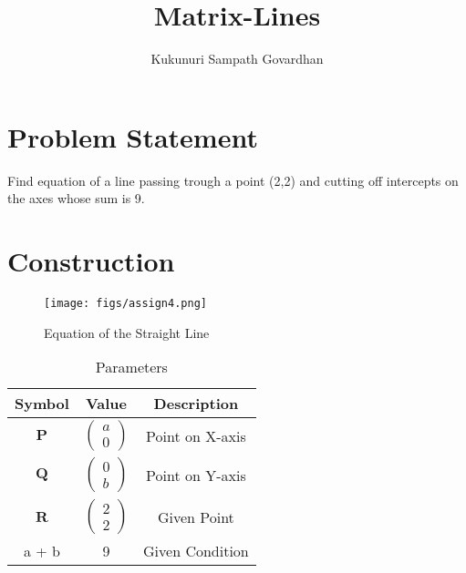 \documentclass[journal,12pt,twocolumn]{IEEEtran}
\title{
Matrix-Lines
}
\author{Kukunuri Sampath Govardhan}
\newcommand{\myvec}[1]{\ensuremath{\begin{pmatrix}#1\end{pmatrix}}}
\let\vec\mathbf
\begin{document}
\maketitle
\tableofcontents
\bigskip
\section{Problem Statement}
Find equation of a line passing trough a point (2,2) and cutting off intercepts on the axes whose sum is 9.\\
\section{Construction}
\begin{figure}[h]
    \centering
\texttt{[image: figs/assign4.png]}
    \caption{Equation of the Straight Line}
    \label{fig:my_label}
\end{figure}
\vspace{2cm}
\begin{table}[h]
    \centering
    \begin{tabular}{|c|c|c|}
       \hline
       \textbf{Symbol}&\textbf{Value}&\textbf{Description}  \\
       \hline
	    $\vec{P}$ & $\myvec{
		    a\\
		    0}$
	    & Point on X-axis\\
        \hline
	    $\vec{Q}$ & $\myvec{0\\b}$
 & Point on Y-axis\\
        \hline
	    $\vec{R}$ & $\myvec{
  2\\
  2}$
 & Given Point \\
        \hline
        a + b & 9 & Given Condition\\
        \hline
    \end{tabular}
    \caption{Parameters}
    \label{tab:my_label}
\end{table}
\end{document}
